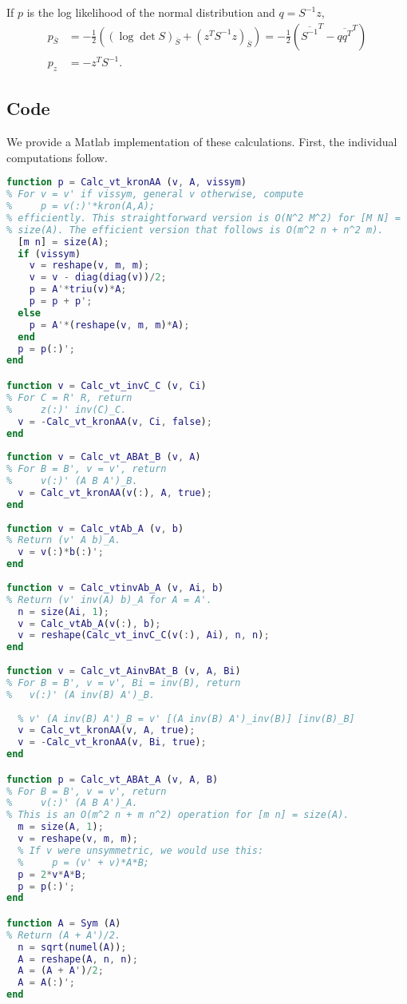 \documentclass[10pt,fleqn]{article}
\renewcommand{\vec}[1]{\ensuremath{\overline{#1}}}
\begin{document}
If $p$ is the log likelihood of the normal distribution and $q = S^{-1} z$,
\begin{align}
  p_{\vec S} &= -\frac{1}{2} ((\log\det S)_{\vec S} + (z^T S^{-1} z)_{\vec S})
      = -\frac{1}{2} (\vec{S^{-1}}^T - \vec{q q^T}^T) \label{eq:p_S} \\
  p_z &= -z^T S^{-1}. \label{eq:p_z}
\end{align}

\subsection{Code}
We provide a {\sc Matlab} implementation of these calculations. First, the
individual computations follow.
\begin{lstlisting}[language=matlab,basicstyle=\footnotesize]
function p = Calc_vt_kronAA (v, A, vissym)
% For v = v' if vissym, general v otherwise, compute 
%     p = v(:)'*kron(A,A);
% efficiently. This straightforward version is O(N^2 M^2) for [M N] =
% size(A). The efficient version that follows is O(m^2 n + n^2 m).  
  [m n] = size(A);
  if (vissym)
    v = reshape(v, m, m);
    v = v - diag(diag(v))/2;
    p = A'*triu(v)*A;
    p = p + p';
  else
    p = A'*(reshape(v, m, m)*A);
  end
  p = p(:)';
end

function v = Calc_vt_invC_C (v, Ci)
% For C = R' R, return
%     z(:)' inv(C)_C.
  v = -Calc_vt_kronAA(v, Ci, false);
end
  
function v = Calc_vt_ABAt_B (v, A)
% For B = B', v = v', return
%     v(:)' (A B A')_B.
  v = Calc_vt_kronAA(v(:), A, true);
end
  
function v = Calc_vtAb_A (v, b)
% Return (v' A b)_A.
  v = v(:)*b(:)';
end
  
function v = Calc_vtinvAb_A (v, Ai, b)
% Return (v' inv(A) b)_A for A = A'.
  n = size(Ai, 1);
  v = Calc_vtAb_A(v(:), b);
  v = reshape(Calc_vt_invC_C(v(:), Ai), n, n);
end
  
function v = Calc_vt_AinvBAt_B (v, A, Bi)
% For B = B', v = v', Bi = inv(B), return
%   v(:)' (A inv(B) A')_B.
  
  % v' (A inv(B) A')_B = v' [(A inv(B) A')_inv(B)] [inv(B)_B]
  v = Calc_vt_kronAA(v, A, true);
  v = -Calc_vt_kronAA(v, Bi, true);
end

function p = Calc_vt_ABAt_A (v, A, B)
% For B = B', v = v', return
%     v(:)' (A B A')_A.
% This is an O(m^2 n + m n^2) operation for [m n] = size(A).
  m = size(A, 1);
  v = reshape(v, m, m);
  % If v were unsymmetric, we would use this:
  %     p = (v' + v)*A*B;
  p = 2*v*A*B;
  p = p(:)';
end

function A = Sym (A)
% Return (A + A')/2.
  n = sqrt(numel(A));
  A = reshape(A, n, n);
  A = (A + A')/2;
  A = A(:)';
end
\end{lstlisting}
\end{document}

